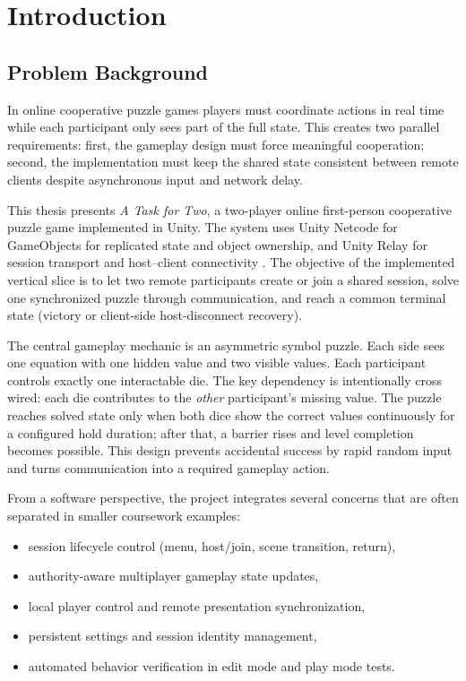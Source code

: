 \chapter{Introduction}

\section{Problem Background}
In online cooperative puzzle games players must coordinate actions in real time while each participant only sees part of the full state. This creates two parallel requirements: first, the gameplay design must force meaningful cooperation; second, the implementation must keep the shared state consistent between remote clients despite asynchronous input and network delay.

This thesis presents \textit{A Task for Two}, a two-player online first-person cooperative puzzle game implemented in Unity. The system uses Unity Netcode for GameObjects for replicated state and object ownership, and Unity Relay for session transport and host--client connectivity \cite{unity_ngo_networkvariable_docs,unity_ngo_rpc_docs,unity_relay_docs}. The objective of the implemented vertical slice is to let two remote participants create or join a shared session, solve one synchronized puzzle through communication, and reach a common terminal state (victory or client-side host-disconnect recovery).

The central gameplay mechanic is an asymmetric symbol puzzle. Each side sees one equation with one hidden value and two visible values. Each participant controls exactly one interactable die. The key dependency is intentionally cross wired: each die contributes to the \emph{other} participant's missing value. The puzzle reaches solved state only when both dice show the correct values continuously for a configured hold duration; after that, a barrier rises and level completion becomes possible. This design prevents accidental success by rapid random input and turns communication into a required gameplay action.

From a software perspective, the project integrates several concerns that are often separated in smaller coursework examples:
\begin{itemize}
\item session lifecycle control (menu, host/join, scene transition, return),
\item authority-aware multiplayer gameplay state updates,
\item local player control and remote presentation synchronization,
\item persistent settings and session identity management,
\item automated behavior verification in edit mode and play mode tests.
\end{itemize}

